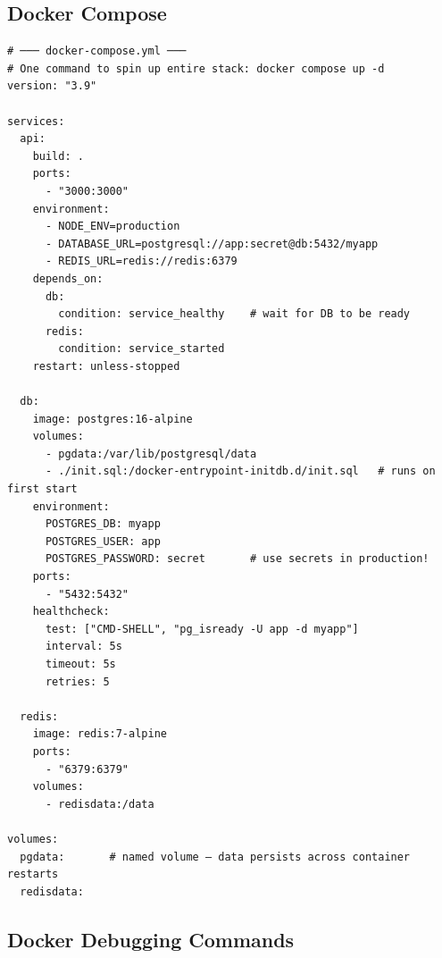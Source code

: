 \documentclass[10pt, a4paper]{article}
\begin{document}
\subsection{Docker Compose}


\begin{lstlisting}
# ─── docker-compose.yml ───
# One command to spin up entire stack: docker compose up -d
version: "3.9"

services:
  api:
    build: .
    ports:
      - "3000:3000"
    environment:
      - NODE_ENV=production
      - DATABASE_URL=postgresql://app:secret@db:5432/myapp
      - REDIS_URL=redis://redis:6379
    depends_on:
      db:
        condition: service_healthy    # wait for DB to be ready
      redis:
        condition: service_started
    restart: unless-stopped

  db:
    image: postgres:16-alpine
    volumes:
      - pgdata:/var/lib/postgresql/data
      - ./init.sql:/docker-entrypoint-initdb.d/init.sql   # runs on first start
    environment:
      POSTGRES_DB: myapp
      POSTGRES_USER: app
      POSTGRES_PASSWORD: secret       # use secrets in production!
    ports:
      - "5432:5432"
    healthcheck:
      test: ["CMD-SHELL", "pg_isready -U app -d myapp"]
      interval: 5s
      timeout: 5s
      retries: 5

  redis:
    image: redis:7-alpine
    ports:
      - "6379:6379"
    volumes:
      - redisdata:/data

volumes:
  pgdata:       # named volume — data persists across container restarts
  redisdata:
\end{lstlisting}


\subsection{Docker Debugging Commands}
\end{document}
